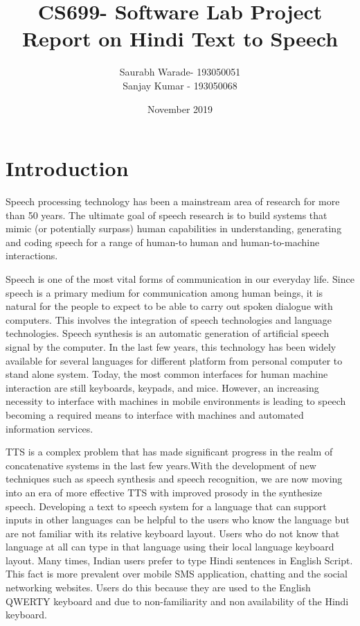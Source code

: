 \documentclass{article}
\title{{\Huge CS699- Software Lab Project Report on Hindi Text to Speech }}
\author{\Large Saurabh Warade- 193050051\\
\Large  Sanjay Kumar - 193050068}
\date{November 2019}
\begin{document}
\maketitle

\thispagestyle{empty}
\newpage

\clearpage
{}
\tableofcontents
\newpage

\section {Introduction}

\large Speech processing technology has been a mainstream 
area of research for more than 50 years. The ultimate 
goal of speech research is to build systems that mimic (or 
potentially surpass) human capabilities in understanding, 
generating and coding speech for a range of human-tohuman and human-to-machine interactions.\par
Speech is one of the most vital forms of communication in 
our everyday life. Since speech is a primary medium for 
communication among human beings, it is natural for the 
people to expect to be able to carry out spoken dialogue 
with computers. This involves the integration of speech 
technologies and language technologies. Speech synthesis 
is an automatic generation of artificial speech signal by 
the computer. In the last few years, this technology has 
been widely available for several languages for different 
platform from personal computer to stand alone system. 
Today, the most common interfaces for human machine 
interaction are still keyboards, keypads, and mice. 
However, an increasing necessity to interface with 
machines in mobile environments is leading to speech 
becoming a required means to interface with machines 
and automated information services.\par
TTS is a complex problem that has made significant progress in the realm of 
concatenative systems in the last few years.With the 
development of new techniques such as speech synthesis 
and speech recognition, we are now moving into an era of 
more effective TTS with improved prosody in the 
synthesize speech. Developing a text to speech system for 
a language that can support inputs in other languages can 
be helpful to the users who know the language but are not 
familiar with its relative keyboard layout. Users who do 
not know that language at all can type in that language 
using their local language keyboard layout. Many times,
Indian users prefer to type Hindi sentences in English 
Script. This fact is more prevalent over mobile SMS 
application, chatting and the social networking websites. 
Users do this because they are used to the English 
QWERTY keyboard and due to non-familiarity and nonavailability of the Hindi keyboard.
\end{document}
